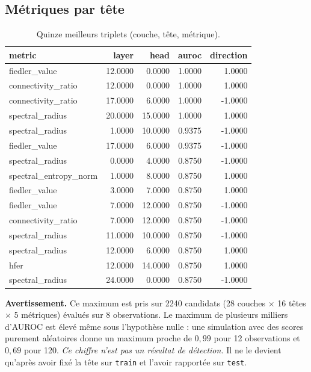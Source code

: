\documentclass[11pt,a4paper]{article}
\begin{document}
\subsection{Métriques par tête}

\begin{table}[htbp]
\centering
\small
\begin{tabular}{lrrrr}
\hline
metric & layer & head & auroc & direction \\
\hline
fiedler\_value & 12.0000 & 0.0000 & 1.0000 & 1.0000 \\
connectivity\_ratio & 12.0000 & 0.0000 & 1.0000 & 1.0000 \\
connectivity\_ratio & 17.0000 & 6.0000 & 1.0000 & -1.0000 \\
spectral\_radius & 20.0000 & 15.0000 & 1.0000 & 1.0000 \\
spectral\_radius & 1.0000 & 10.0000 & 0.9375 & -1.0000 \\
fiedler\_value & 17.0000 & 6.0000 & 0.9375 & -1.0000 \\
spectral\_radius & 0.0000 & 4.0000 & 0.8750 & -1.0000 \\
spectral\_entropy\_norm & 1.0000 & 8.0000 & 0.8750 & 1.0000 \\
fiedler\_value & 3.0000 & 7.0000 & 0.8750 & 1.0000 \\
fiedler\_value & 7.0000 & 12.0000 & 0.8750 & -1.0000 \\
connectivity\_ratio & 7.0000 & 12.0000 & 0.8750 & -1.0000 \\
spectral\_radius & 11.0000 & 10.0000 & 0.8750 & -1.0000 \\
spectral\_radius & 12.0000 & 6.0000 & 0.8750 & 1.0000 \\
hfer & 12.0000 & 14.0000 & 0.8750 & 1.0000 \\
spectral\_radius & 24.0000 & 0.0000 & 0.8750 & -1.0000 \\
\hline
\end{tabular}
\caption{Quinze meilleurs triplets (couche, tête, métrique).}
\label{tab:heads}
\end{table}


\textbf{Avertissement.} Ce maximum est pris sur 2240 candidats
(28 couches $\times$ 16 têtes
$\times$ 5 métriques) évalués sur 8
observations. Le maximum de plusieurs milliers d'AUROC est élevé même sous
l'hypothèse nulle : une simulation avec des scores purement aléatoires donne
un maximum proche de $0{,}99$ pour 12 observations et $0{,}69$ pour 120.
\emph{Ce chiffre n'est pas un résultat de détection.} Il ne le devient
qu'après avoir fixé la tête sur \texttt{train} et l'avoir rapportée sur
\texttt{test}.
\end{document}
